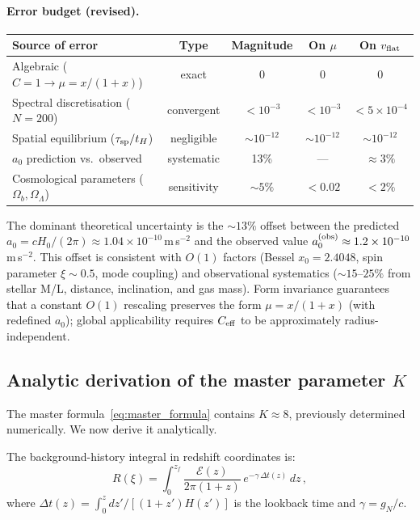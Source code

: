 \documentclass[11pt]{article}
\begin{document}
\paragraph{Error budget (revised).}
\begin{center}
\begin{tabular}{lcccc}
\toprule
\textbf{Source of error} & \textbf{Type} & \textbf{Magnitude}
  & \textbf{On $\mu$} & \textbf{On $v_{\rm flat}$} \\
\midrule
Algebraic ($C\!=\!1\to\mu\!=\!x/(1\!+\!x)$)
  & exact & 0 & 0 & 0 \\
Spectral discretisation ($N\!=\!200$)
  & convergent & $<10^{-3}$ & $<10^{-3}$ & $<5\times 10^{-4}$ \\
Spatial equilibrium ($\tau_{\rm sp}/t_H$)
  & negligible & $\sim 10^{-12}$ & $\sim 10^{-12}$ & $\sim 10^{-12}$ \\
$a_0$ prediction vs.\ observed
  & systematic & 13\% & --- & $\approx 3\%$ \\
Cosmological parameters ($\Omega_b,\Omega_\Lambda$)
  & sensitivity & $\sim 5\%$ & $<0.02$ & $<2\%$ \\
\bottomrule
\end{tabular}
\end{center}

\medskip\noindent
The dominant theoretical uncertainty is the $\sim 13\%$
offset between the predicted $a_0=cH_0/(2\pi)\approx 1.04
\times 10^{-10}\,$m\,s$^{-2}$ and the observed value
$a_0^{\rm (obs)}\approx 1.2\times 10^{-10}\,$m\,s$^{-2}$.
This offset is consistent with $O(1)$ factors
(Bessel $x_0=2.4048$, spin parameter $\xi\sim 0.5$,
mode coupling) and observational systematics ($\sim 15$--$25\%$
from stellar M/L, distance, inclination, and gas mass).
Form invariance guarantees that a constant $O(1)$
rescaling preserves the form $\mu=x/(1+x)$
(with redefined $a_0$); global applicability requires
$C_{\rm eff}$ to be approximately radius-independent.

\subsection[Analytic derivation of the master parameter K]{Analytic derivation of the master parameter $K$}
\label{sec:K_analytic}

The master formula~\eqref{eq:master_formula} contains $K\approx 8$,
previously determined numerically.  We now derive it analytically.

The background-history integral in redshift coordinates is:
\begin{equation}\label{eq:secular_z}
  R(\xi) = \int_0^{z_f}\!
  \frac{\mathcal{E}(z)}{2\pi(1+z)}\,
  e^{-\gamma\,\Delta t(z)}\,dz\,,
\end{equation}
where $\Delta t(z)=\int_0^z dz'/[(1+z')H(z')]$ is the lookback time
and $\gamma=g_N/c$.
\end{document}
